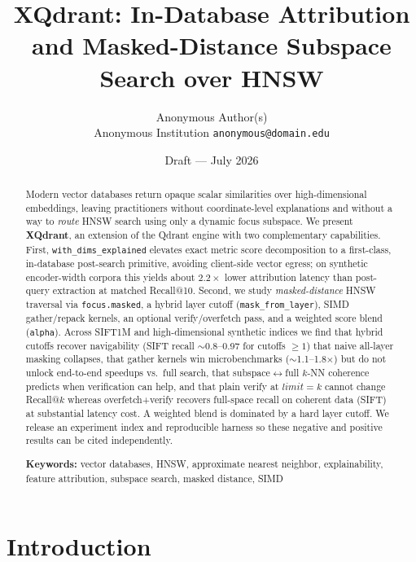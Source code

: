 \documentclass[11pt,a4paper]{article}
\title{XQdrant: In-Database Attribution and Masked-Distance Subspace Search
  over HNSW}
\author{Anonymous Author(s)\\
  \small Anonymous Institution \quad\texttt{anonymous@domain.edu}}
\date{Draft --- July 2026}
\begin{document}
\maketitle

\begin{abstract}
\noindent
Modern vector databases return opaque scalar similarities over high-dimensional
embeddings, leaving practitioners without coordinate-level explanations and
without a way to \emph{route} HNSW search using only a dynamic focus subspace.
We present \textbf{XQdrant}, an extension of the Qdrant engine with two
complementary capabilities.
First, \texttt{with\_dims\_explained} elevates exact metric score decomposition
to a first-class, in-database post-search primitive, avoiding client-side vector
egress; on synthetic encoder-width corpora this yields about $2.2\times$ lower
attribution latency than post-query extraction at matched Recall@10.
Second, we study \emph{masked-distance} HNSW traversal via
\texttt{focus.masked}, a hybrid layer cutoff (\texttt{mask\_from\_layer}), SIMD
gather/repack kernels, an optional verify/overfetch pass, and a weighted score
blend (\texttt{alpha}).
Across SIFT1M and high-dimensional synthetic indices we find that hybrid cutoffs
recover navigability (SIFT recall $\sim$0.8--0.97 for cutoffs $\ge 1$) that
naive all-layer masking collapses, that gather kernels win microbenchmarks
($\sim$1.1--1.8$\times$) but do not unlock end-to-end speedups vs.\ full search,
that subspace$\leftrightarrow$full $k$-NN coherence predicts when verification
can help, and that plain verify at $\mathit{limit}{=}k$ cannot change Recall@$k$
whereas overfetch+verify recovers full-space recall on coherent data (SIFT) at
substantial latency cost.
A weighted blend is dominated by a hard layer cutoff.
We release an experiment index and reproducible harness so these negative and
positive results can be cited independently.

\medskip
\noindent\textbf{Keywords:}
vector databases, HNSW, approximate nearest neighbor, explainability,
feature attribution, subspace search, masked distance, SIMD
\end{abstract}

\section{Introduction}
\label{sec:intro}
\end{document}
